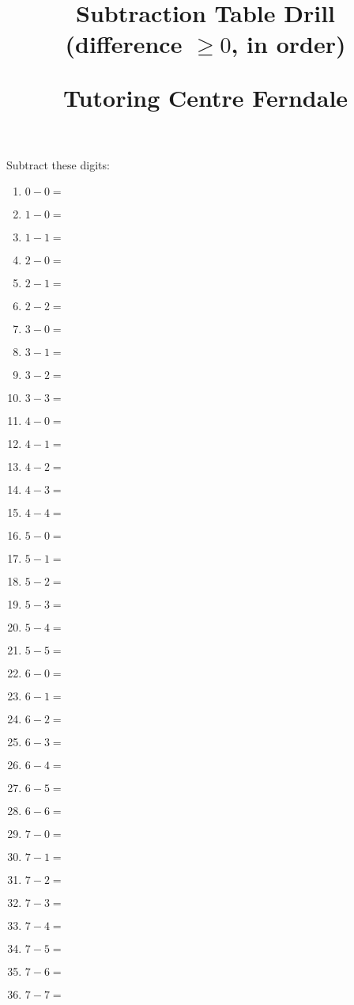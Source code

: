 \documentclass{article}
\title{Subtraction Table Drill\\(difference $\geq 0$, in order)\\
\begin{normalsize}
Tutoring Centre Ferndale
\end{normalsize}}
\author{}
\date{}
\begin{document}
\maketitle

\noindent Subtract these digits:

\begin{multicols}{4}
\begin{enumerate}

\item $0 - 0 =$

\item $1 - 0 =$
\item $1 - 1 =$

\item $2 - 0 =$
\item $2 - 1 =$
\item $2 - 2 =$

\item $3 - 0 =$
\item $3 - 1 =$
\item $3 - 2 =$
\item $3 - 3 =$

\item $4 - 0 =$
\item $4 - 1 =$
\item $4 - 2 =$
\item $4 - 3 =$
\item $4 - 4 =$

\item $5 - 0 =$
\item $5 - 1 =$
\item $5 - 2 =$
\item $5 - 3 =$
\item $5 - 4 =$
\item $5 - 5 =$

\item $6 - 0 =$
\item $6 - 1 =$
\item $6 - 2 =$
\item $6 - 3 =$
\item $6 - 4 =$
\item $6 - 5 =$
\item $6 - 6 =$

\item $7 - 0 =$
\item $7 - 1 =$
\item $7 - 2 =$
\item $7 - 3 =$
\item $7 - 4 =$
\item $7 - 5 =$
\item $7 - 6 =$
\item $7 - 7 =$


\end{enumerate}
\end{multicols}
\end{document}
